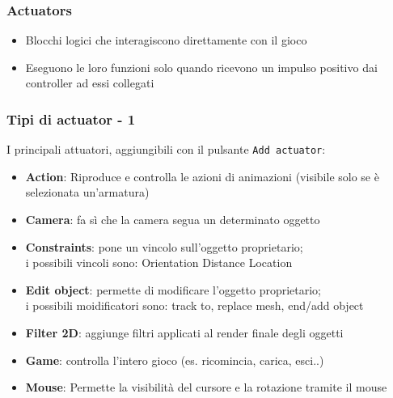 \documentclass{beamer}
\def\code#1{\texttt{#1}}
\begin{document}
		\begin{frame}
			\frametitle{Actuators} %
			\begin{itemize}
				\item Blocchi logici che interagiscono direttamente con il gioco
				\item Eseguono le loro funzioni solo quando ricevono un \textcolor{BlenderOrange}{impulso positivo} dai controller ad essi collegati
			\end{itemize}
		\end{frame}			
		\begin{frame}
			\frametitle{Tipi di actuator - 1}
			I principali attuatori, aggiungibili con il pulsante \code{Add actuator}:
			\begin{itemize}
				\item \textbf{Action}: {\footnotesize Riproduce e controlla le azioni di animazioni (visibile solo se è selezionata un'armatura)} %
				\item \textbf{Camera}: {\footnotesize fa sì che la camera segua un determinato oggetto}
				\item \textbf{Constraints}: {\footnotesize  pone un vincolo sull’oggetto proprietario; \\i possibili vincoli sono: Orientation Distance Location}
				\item \textbf{Edit object}: {\footnotesize permette di modificare l'oggetto proprietario; \\i possibili moidificatori sono: track to, replace mesh, end/add object}
				\item \textbf{Filter 2D}: {\footnotesize aggiunge filtri applicati al render finale degli oggetti}
				\item \textbf{Game}: {\footnotesize controlla l'intero gioco (es. ricomincia, carica, esci..)}
				\item \textbf{Mouse}: {\footnotesize Permette la visibilità del cursore e la rotazione tramite il mouse}
			\end{itemize}
		\end{frame}
\end{document}
